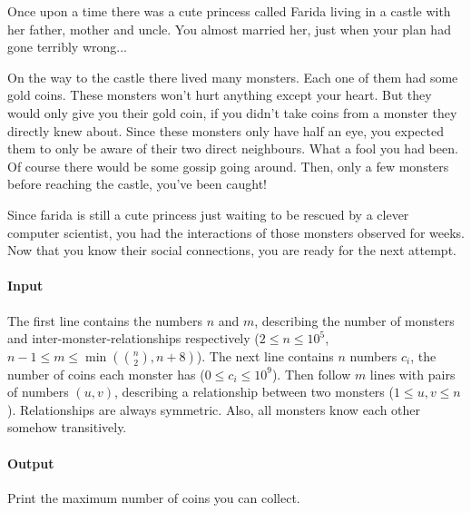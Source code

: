 



\makeheader

Once upon a time there was a cute princess called Farida living in a castle with her father, mother and uncle.
You almost married her, just when your plan had gone terribly wrong...

On the way to the castle there lived many monsters.
Each one of them had some gold coins.
These monsters won't hurt anything except your heart.
But they would only give you their gold coin, if you didn't take coins from a monster they directly knew about.
Since these monsters only have half an eye, you expected them to only be aware of their two direct neighbours.
What a fool you had been.
Of course there would be some gossip going around.
Then, only a few monsters before reaching the castle, you've been caught!

Since farida is still a cute princess just waiting to be rescued by a clever computer scientist, you had the interactions of those monsters observed for weeks.
Now that you know their social connections, you are ready for the next attempt.

\paragraph*{Input}

The first line contains the numbers $n$ and $m$, describing the number of monsters and inter-monster-relationships respectively ($2 \leq n \leq 10^5$, $n - 1 \leq m \leq \min(\binom{n}{2}, n + 8)$).
The next line contains $n$ numbers $c_i$, the number of coins each monster has ($0 \leq c_i \leq 10^9$).
Then follow $m$ lines with pairs of numbers $(u, v)$, describing a relationship between two monsters ($1 \leq u, v \leq n$).
Relationships are always symmetric. Also, all monsters know each other somehow transitively.

\paragraph*{Output}

Print the maximum number of coins you can collect.

\begin{samples}
\end{samples}

